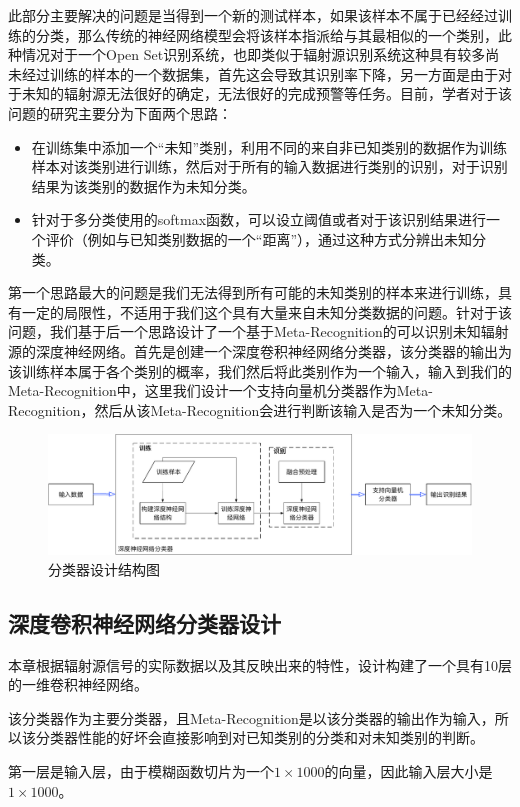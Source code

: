 此部分主要解决的问题是当得到一个新的测试样本，如果该样本不属于已经经过训练的分类，那么传统的神经网络模型会将该样本指派给与其最相似的一个类别，此种情况对于一个Open Set识别系统，也即类似于辐射源识别系统这种具有较多尚未经过训练的样本的一个数据集，首先这会导致其识别率下降，另一方面是由于对于未知的辐射源无法很好的确定，无法很好的完成预警等任务。目前，学者对于该问题的研究主要分为下面两个思路：
\begin{itemize}
	\item 在训练集中添加一个“未知”类别，利用不同的来自非已知类别的数据作为训练样本对该类别进行训练，然后对于所有的输入数据进行类别的识别，对于识别结果为该类别的数据作为未知分类。
	\item 针对于多分类使用的softmax函数，可以设立阈值或者对于该识别结果进行一个评价（例如与已知类别数据的一个“距离”），通过这种方式分辨出未知分类。
\end{itemize}
第一个思路最大的问题是我们无法得到所有可能的未知类别的样本来进行训练，具有一定的局限性，不适用于我们这个具有大量来自未知分类数据的问题。针对于该问题，我们基于后一个思路设计了一个基于Meta-Recognition的可以识别未知辐射源的深度神经网络。首先是创建一个深度卷积神经网络分类器，该分类器的输出为该训练样本属于各个类别的概率，我们然后将此类别作为一个输入，输入到我们的Meta-Recognition中，这里我们设计一个支持向量机分类器作为Meta-Recognition，然后从该Meta-Recognition会进行判断该输入是否为一个未知分类。
\begin{figure}[hbt]
	\centering
	\includegraphics[width=13.5cm]{figures/emitter/frame_emitter}
	\caption{分类器设计结构图}
\end{figure}

\subsection{深度卷积神经网络分类器设计}
本章根据辐射源信号的实际数据以及其反映出来的特性，设计构建了一个具有10层的一维卷积神经网络。

该分类器作为主要分类器，且Meta-Recognition是以该分类器的输出作为输入，所以该分类器性能的好坏会直接影响到对已知类别的分类和对未知类别的判断。

第一层是输入层，由于模糊函数切片为一个$1 \times 1000$的向量，因此输入层大小是$1 \times 1000$。

